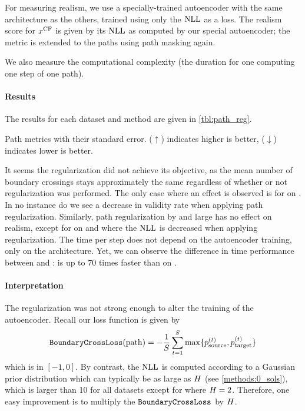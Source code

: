 \documentclass[../main.tex]{subfiles}
\begin{document}
For measuring realism, we use a specially-trained autoencoder with the same architecture as the others, trained using only the $\text{NLL}$ as a loss.
The realism score for $x^\mathrm{CF}$ is given by its $\text{NLL}$ as computed by our special autoencoder;
the metric is extended to the paths using path masking again.

We also measure the computational complexity (the duration for one computing one step of one path).

\paragraph{Results}

The results for each dataset and method are given in \autoref{tbl:path_reg}.

\begin{table}[h!]
    \centering
    
    \caption{Path metrics with their standard error. ($\uparrow$) indicates higher is better, ($\downarrow$) indicates lower is better.}
    \label{tbl:path_reg}
\end{table}

It seems the regularization did not achieve its objective, as the mean number of boundary crossings stays approximately the same regardless of whether or not regularization was performed.
The only case where an effect is observed is for \revise{} on \CakeOnSea{}.
In no instance do we see a decrease in validity rate when applying path regularization.
Similarly, path regularization by and large has no effect on realism, except for \ls{} on \CakeOnSea{} and \ForestCover{} where the $\text{NLL}$ is decreased when applying regularization.
The time per step does not depend on the autoencoder training, only on the architecture.
Yet, we can observe the difference in time performance between \ls{} and \revise{}: \ls{} is up to 70 times faster than \revise{} on \OnlineNewsPopularity{}.

\paragraph{Interpretation}

The regularization was not strong enough to alter the training of the autoencoder.
Recall our loss function is given by
\begin{align*}
    \mathtt{BoundaryCrossLoss}(\mathrm{path}) =
    - \frac{1}{S} \sum_{t=1}^{S}
    \max \{ p^{(t)}_{\mathrm{source}}, p^{(t)}_{\mathrm{target}} \}
\end{align*}
which is in $[-1, 0]$.
By contrast, the $\text{NLL}$ is computed according to a Gaussian prior distribution which can typically be as large as $H$ (see \autoref{methods:0_sols}), which is larger than 10 for all datasets except for \CakeOnSea{} where $H=2$.
Therefore, one easy improvement is to multiply the $\mathtt{BoundaryCrossLoss}$ by $H$.
\end{document}
